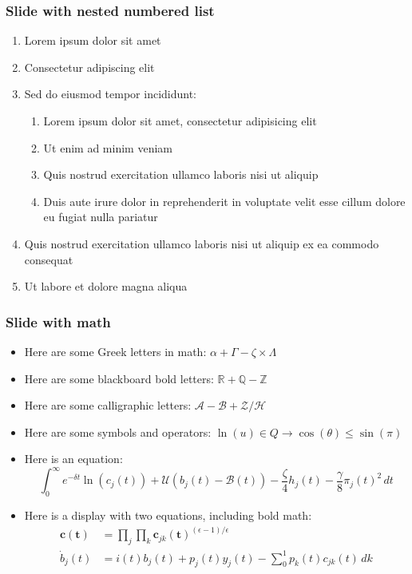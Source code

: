 \documentclass[11pt,xcolor={dvipsnames},hyperref={pdftex,pdfpagemode=UseNone,hidelinks,pdfdisplaydoctitle=true},usepdftitle=false]{beamer}
\begin{document}
\begin{frame}
\frametitle{Slide with nested numbered list}
\begin{enumerate}
\item Lorem ipsum dolor sit amet
\item Consectetur adipiscing elit
\item Sed do eiusmod tempor incididunt:
\begin{enumerate}
\item Lorem ipsum dolor sit amet, consectetur adipisicing elit
\item Ut enim ad minim veniam
\item Quis nostrud exercitation ullamco laboris nisi ut aliquip
\item Duis aute irure dolor in reprehenderit in voluptate velit esse cillum dolore eu fugiat nulla pariatur
\end{enumerate}
\item Quis nostrud exercitation ullamco laboris nisi ut aliquip ex ea commodo consequat
\item Ut labore et dolore magna aliqua
\end{enumerate}
\end{frame}

\begin{frame}
\end{frame}

\begin{frame}
\frametitle{Slide with math}
\begin{itemize}
\item Here are some Greek letters in math: $\alpha + \Gamma - \zeta \times \Lambda$
\item Here are some blackboard bold letters: $\mathbb{R} + \mathbb{Q} - \mathbb{Z}$
\item Here are some calligraphic letters: $\mathcal{A} - \mathcal{B} + \mathcal{Z} / \mathcal{H}$
\item Here are some symbols and operators: $\ln(u) \in Q \to \cos(\theta) \leq \sin(\pi)$
\item Here is an equation:
\begin{equation*}
\int_{0}^{\infty}e^{-\delta t} \ln(c_{j}(t))+ \mathcal{U}(b_{j}(t) - \mathcal{B}(t))- \frac{\zeta}{4} h_{j}(t) -\frac{\gamma}{8} \pi_{j}(t)^2\,dt
\end{equation*}
\item Here is a display with two equations, including bold math:
\begin{align*}
\bm{c}(\bm{t}) &= \prod_{j} \prod_{k} \bm{c}_{jk}(\bm{t})^{(\epsilon-1)/\epsilon} \\
\dot{b}_{j}(t) &= i(t) b_{j}(t) + p_{j}(t)  y_{j}(t) - \sum_0^1 p_{k}(t) c_{jk}(t)\,dk
\end{align*}
\end{itemize}
\end{frame}
\end{document}
